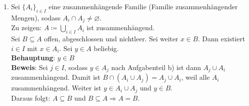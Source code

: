\begin{solution}
\begin{enumerate}[label=(\alph*)]
    \item Sei \( {\{ A_i \}}_{i \in I} \) eine zusammenhängende Familie (Familie zusammenhängender Mengen), sodass 
    \( A_i \cap A_j \neq \varnothing \). \\ 
    Zu zeigen: \( A \coloneqq \bigcup_{i \in I} A_i \) ist zusammenhängend. \\
    Sei \( B \subseteq A \) offen, abgeschlossen und nichtleer. Sei weiter \( x \in B \). Dann existiert \( i \in I \) mit
    \( x \in A_i \). Sei \( y \in A \) beliebig. \\
    \textbf{Behauptung}: \( y \in B \) \\
    \textbf{Beweis}: Sei \( j \in I \), sodass \( y \in A_j \) nach Aufgabenteil b) ist dann \( A_j \cup A_i \) zusammenhängend. Damit ist \( B \cap (A_i \cup A_j) = A_j \cup A_i \), weil alle \( A_i \) zusammenhängend.
    Weiter ist \( y \in A_i \cup A_j \) und \( y \in B \). \\
    Daraus folgt: \( A \subseteq B \) und \( B \subseteq A \Rightarrow A = B \).
  \end{enumerate}
\end{solution}

